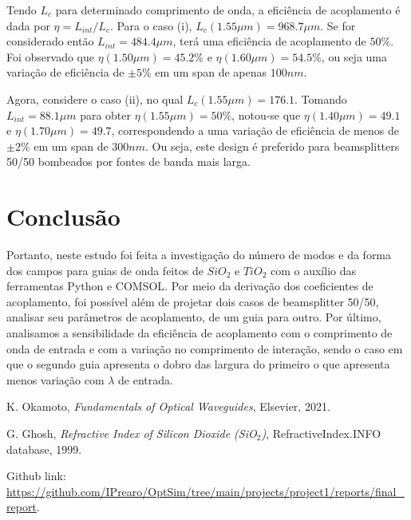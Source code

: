 \documentclass[final,12pt,times,twocolumn]{elsarticle}
\begin{document}
Tendo $L_c$ para determinado comprimento de onda, a eficiência de acoplamento é dada por $\eta = L_{int} / L_c$. Para o caso (i), $L_c(1.55\mu m) = 968.7\mu m$. Se for considerado então $L_{int} = 484.4\mu m$, terá uma eficiência de acoplamento de $50\%$. Foi observado que $\eta(1.50\mu m) = 45.2\%$ e $\eta(1.60\mu m) = 54.5\%$, ou seja uma variação de eficiência de $\pm 5\%$ em um span de apenas $100nm$.

Agora, considere o caso (ii), no qual $L_c(1.55\mu m) = 176.1$. Tomando $L_{int} = 88.1 \mu m$ para obter $\eta(1.55\mu m) = 50\%$, notou-se que $\eta(1.40\mu m) = 49.1$ e $\eta(1.70\mu m) = 49.7$, correspondendo a uma variação de eficiência de menos de $\pm 2\%$ em um span de $300nm$. Ou seja, este design é preferido para beamsplitters 50/50 bombeados por fontes de banda mais larga. 

\section{Conclusão}
\label{sec:conclusion}

Portanto, neste estudo foi feita a investigação do número de modos e da forma dos campos para guias de onda feitos de $SiO_2$ e $TiO_2$ com o auxílio das ferramentas Python e COMSOL. Por meio da derivação dos coeficientes de acoplamento, foi possível além de projetar dois casos de beamsplitter 50/50, analisar seu parâmetros de acoplamento, de um guia para outro. Por último, analisamos a sensibilidade da eficiência de acoplamento com o comprimento de onda de entrada e com a variação no comprimento de interação, sendo o caso em que o segundo guia apresenta  o dobro das largura do primeiro o que apresenta menos variação com $\lambda$ de entrada.

\begin{thebibliography}{99}

K. Okamoto, \textit{Fundamentals of Optical Waveguides}, Elsevier, 2021.

G. Ghosh, \textit{Refractive Index of Silicon Dioxide (SiO$_2$)}, RefractiveIndex.INFO database, 1999.

\end{thebibliography}

Github link: \url{https://github.com/IPrearo/OptSim/tree/main/projects/project1/reports/final_report}.
\end{document}
